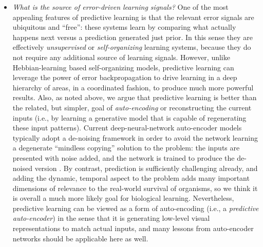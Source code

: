 \documentclass[11pt,twoside]{article}
\newif\myifpdf
\begin{document}
\begin{itemize}
\item {\em What is the source of error-driven learning signals?}  One of the most appealing features of predictive learning is that the relevant error signals are ubiquitous and ``free'': these systems learn by comparing what actually happens next versus a prediction generated just prior.  In this sense they are effectively {\em unsupervised} or {\em self-organizing} learning systems, because they do not require any additional source of learning signals.  However, unlike Hebbian-learning based self-organizing models, predictive learning can leverage the power of error backpropagation to drive learning in a deep hierarchy of areas, in a coordinated fashion, to produce much more powerful results.  Also, as noted above, we argue that predictive learning is better than the related, but simpler, goal of {\em auto-encoding} or reconstructing the current inputs (i.e., by learning a generative model that is capable of regenerating these input patterns).  Current deep-neural-network auto-encoder models typically adopt a de-noising framework in order to avoid the network learning a degenerate ``mindless copying'' solution to the problem: the inputs are presented with noise added, and the network is trained to produce the de-noised version \cite{BengioYaoAlainEtAl13,Valpola14,RasmusBerglundHonkalaEtAl15}.  By contrast, prediction is sufficiently challenging already, and adding the dynamic, temporal aspect to the problem adds many important dimensions of relevance to the real-world survival of organisms, so we think it is overall a much more likely goal for biological learning.  Nevertheless, predictive learning can be viewed as a form of auto-encoding (i.e., a {\em predictive auto-encoder}) in the sense that it is generating low-level visual representations to match actual inputs, and many lessons from auto-encoder networks should be applicable here as well.


\end{itemize}
\end{document}
